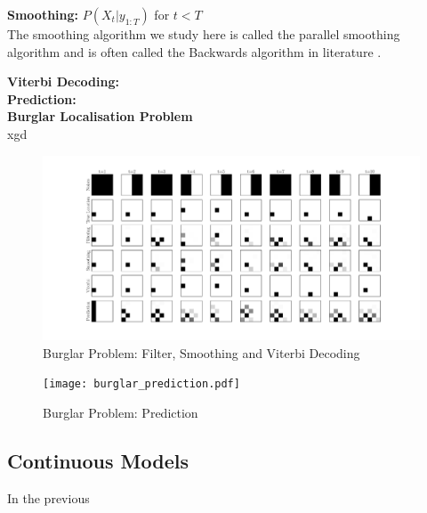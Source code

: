 \documentclass[../masters.tex]{subfiles}
\begin{document}
\textbf{Smoothing:} $P(X_t|y_{1:T})$ for $t<T$\\
The smoothing algorithm we study here is called the parallel smoothing algorithm and is often called the Backwards algorithm in literature \cite{murphy1}.


\textbf{Viterbi Decoding:} \\

\textbf{Prediction:} \\


\textbf{Burglar Localisation Problem} \\
xgd
\begin{figure}[H] 
\centering
\includegraphics[scale=0.30]{burglar_inference.pdf}
\caption{Burglar Problem: Filter, Smoothing and Viterbi Decoding}
\label{fig_burglar_inference}
\end{figure}

\begin{figure}[H] 
\centering
\texttt{[image: burglar\_prediction.pdf]}
\caption{Burglar Problem: Prediction}
\label{fig_burlgar_prediction}
\end{figure}


\subsection{Continuous Models}
In the previous



\end{document}
